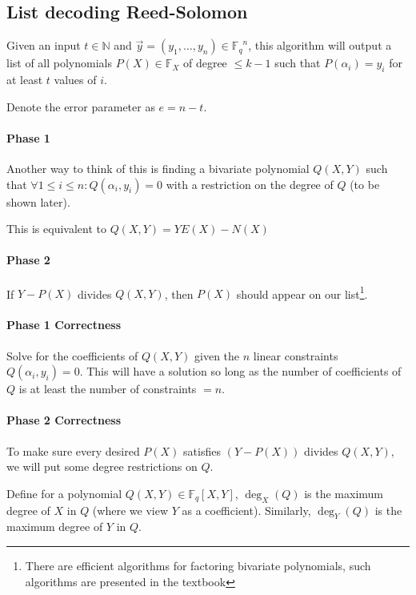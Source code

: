 \documentclass{idc_msc}
\newcommand{\Fq}[1][q]{{\mathbb{F}_{#1}}}
\begin{document}
\subsection{List decoding Reed-Solomon}

Given an input \(t \in \mathbb{N}\) and \(\vec{y} = (y_1,\ldots,y_n) \in \Fq^n\), this algorithm will output a list of all polynomials \(P(X) \in \Fq[X]\) of degree \(\le k-1\) such that \(P(\alpha_i) = y_i\) for at least \(t\) values of \(i\).

Denote the error parameter as \(e = n - t\).

\paragraph{Phase 1}

Another way to think of this is finding a bivariate polynomial \(Q(X,Y)\) such that \(\forall 1 \le i \le n : Q(\alpha_i, y_i) = 0\) with a restriction on the degree of \(Q\) (to be shown later).

This is equivalent to \(Q(X,Y) = Y E(X) - N(X)\)

\paragraph{Phase 2}

If \(Y - P(X)\) divides \(Q(X,Y)\), then \(P(X)\) should appear on our list\footnote{There are efficient algorithms for factoring bivariate polynomials, such algorithms are presented in the textbook}.

\paragraph{Phase 1 Correctness}

Solve for the coefficients of \(Q(X,Y)\) given the \(n\) linear constraints \(Q(\alpha_i, y_i) = 0\).
This will have a solution so long as the number of coefficients of \(Q\) is at least the number of constraints \(=n\).

\paragraph{Phase 2 Correctness}

To make sure every desired \(P(X)\) satisfies \((Y - P(X))\) divides \(Q(X,Y)\), we will put some degree restrictions on \(Q\).

Define for a polynomial \(Q(X,Y) \in \Fq[q] [X,Y]\), \(\deg_X(Q)\) is the maximum degree of \(X\) in \(Q\) (where we view \(Y\) as a coefficient). Similarly, \(\deg_Y(Q)\) is the maximum degree of \(Y\) in \(Q\).
\end{document}
